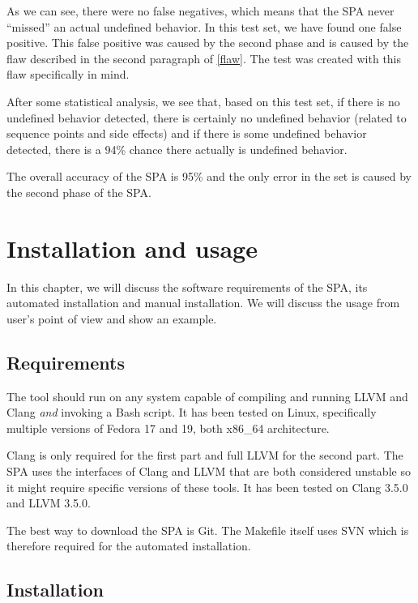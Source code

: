 As we can see, there were no false negatives, which means that the SPA never ``missed'' an actual undefined behavior. In this test set, we have found one false positive. This false positive was caused by the second phase and is caused by the flaw described in the second paragraph of \ref{flaw}. The test was created with this flaw specifically in mind.

After some statistical analysis, we see that, based on this test set, if there is no undefined behavior detected, there is certainly no undefined behavior (related to sequence points and side effects) and if there is some undefined behavior detected, there is a 94\% chance there actually is undefined behavior.

The overall accuracy of the SPA is 95\% and the only error in the set is caused by the second phase of the SPA.

\chapter{Installation and usage}
In this chapter, we will discuss the software requirements of the SPA, its automated installation and manual installation. We will discuss the usage from user's point of view and show an example.
\section{Requirements}
The tool should run on any system capable of compiling and running LLVM and Clang \emph{and} invoking a Bash script. It has been tested on Linux, specifically multiple versions of Fedora 17 and 19, both x86\_64 architecture.

Clang is only required for the first part and full LLVM for the second part. The SPA uses the interfaces of Clang and LLVM that are both considered unstable so it might require specific versions of these tools. It has been tested on Clang 3.5.0  and LLVM 3.5.0.

The best way to download the SPA is Git. The Makefile itself uses SVN which is therefore required for the automated installation.
\section{Installation}
